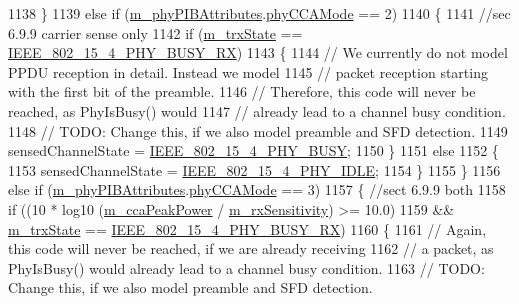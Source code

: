 \begin{DoxyCode}
1138     \}
1139   \textcolor{keywordflow}{else} \textcolor{keywordflow}{if} (\hyperlink{classns3_1_1LrWpanPhy_a7f263bedbdeed627f7c5f2dab8e960c8}{m\_phyPIBAttributes}.\hyperlink{structns3_1_1LrWpanPhyPibAttributes_a41d736be38b2dd87bb9fa2b2090723e8}{phyCCAMode} == 2)
1140     \{
1141       \textcolor{comment}{//sec 6.9.9 carrier sense only}
1142       \textcolor{keywordflow}{if} (\hyperlink{classns3_1_1LrWpanPhy_a316704a4eb96e04f4b960ba3577fe0ce}{m\_trxState} == \hyperlink{group__lr-wpan_gga6494269d13d45c511a07b7ccbb1de754a09f430974fda07ac7d4d483a1ce23b98}{IEEE\_802\_15\_4\_PHY\_BUSY\_RX})
1143         \{
1144           \textcolor{comment}{// We currently do not model PPDU reception in detail. Instead we model}
1145           \textcolor{comment}{// packet reception starting with the first bit of the preamble.}
1146           \textcolor{comment}{// Therefore, this code will never be reached, as PhyIsBusy() would}
1147           \textcolor{comment}{// already lead to a channel busy condition.}
1148           \textcolor{comment}{// TODO: Change this, if we also model preamble and SFD detection.}
1149           sensedChannelState = \hyperlink{group__lr-wpan_gga6494269d13d45c511a07b7ccbb1de754a14641e5190b66ec8ec3903218058dc46}{IEEE\_802\_15\_4\_PHY\_BUSY};
1150         \}
1151       \textcolor{keywordflow}{else}
1152         \{
1153           sensedChannelState = \hyperlink{group__lr-wpan_gga6494269d13d45c511a07b7ccbb1de754af3994414efcd2fac7e312ecb9b3ebd70}{IEEE\_802\_15\_4\_PHY\_IDLE};
1154         \}
1155     \}
1156   \textcolor{keywordflow}{else} \textcolor{keywordflow}{if} (\hyperlink{classns3_1_1LrWpanPhy_a7f263bedbdeed627f7c5f2dab8e960c8}{m\_phyPIBAttributes}.\hyperlink{structns3_1_1LrWpanPhyPibAttributes_a41d736be38b2dd87bb9fa2b2090723e8}{phyCCAMode} == 3)
1157     \{ \textcolor{comment}{//sect 6.9.9 both}
1158       \textcolor{keywordflow}{if} ((10 * log10 (\hyperlink{classns3_1_1LrWpanPhy_a7b801d5943cf39ea427eb3cfd036166e}{m\_ccaPeakPower} / \hyperlink{classns3_1_1LrWpanPhy_a8150b66561c973e8d0f9ef77bac739b8}{m\_rxSensitivity}) >= 10.0)
1159           && \hyperlink{classns3_1_1LrWpanPhy_a316704a4eb96e04f4b960ba3577fe0ce}{m\_trxState} == \hyperlink{group__lr-wpan_gga6494269d13d45c511a07b7ccbb1de754a09f430974fda07ac7d4d483a1ce23b98}{IEEE\_802\_15\_4\_PHY\_BUSY\_RX})
1160         \{
1161           \textcolor{comment}{// Again, this code will never be reached, if we are already receiving}
1162           \textcolor{comment}{// a packet, as PhyIsBusy() would already lead to a channel busy condition.}
1163           \textcolor{comment}{// TODO: Change this, if we also model preamble and SFD detection.}

\end{DoxyCode}
